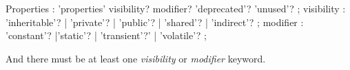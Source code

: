 \begin{rail}
Properties : 'properties'  visibility? modifier? 'deprecated'? 'unused'?
               ;
visibility : 'inheritable'? | 'private'? | 'public'? | 'shared'? | 'indirect'? 
               ;
modifier : 'constant'? |'static'? | 'transient'?' | 'volatile'? 
               ;
\end{rail}
And there must be at least one \emph{visibility} or \emph{modifier} keyword.
